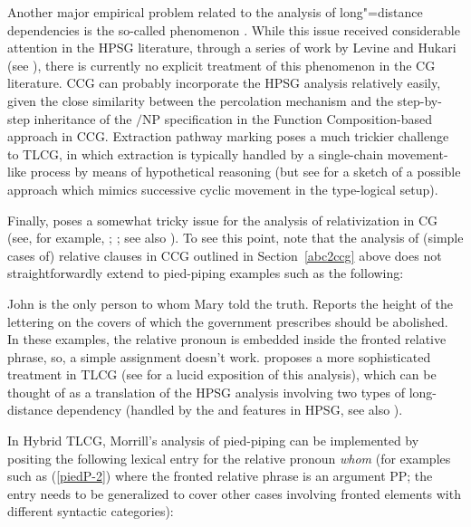 \documentclass[output=paper
                ,modfonts
 	        ,biblatex
                ,babelshorthands
                ,newtxmath
                ,draftmode
                ,colorlinks, citecolor=brown
]{langscibook}
\begin{document}
Another major empirical problem related to the analysis of
long"=distance dependencies is the so-called  phenomenon \citep{mccloskey79,Zaenen83a-u}. While this issue
received considerable attention in the HPSG literature, through a
series of work by Levine and Hukari (see \citealt{LH2006a}), there is
currently no explicit treatment of this phenomenon in the CG
literature. CCG can probably incorporate the HPSG analysis relatively
easily, given the close similarity between the \slasch percolation
mechanism and the step-by-step inheritance of the $/$NP specification
in the Function Composition-based approach in CCG. Extraction pathway
marking poses a much trickier challenge to TLCG, in which extraction
is typically handled by a single-chain movement-like process by means
of hypothetical reasoning (but see 
for a sketch of a possible approach which mimics successive cyclic
movement in the type-logical setup).

Finally,\label{cg:page-pied-piping-start}  poses a somewhat tricky issue for the
analysis of relativization in CG (see, for example,
\citealt{Pollard88a,Morrill94a-u};
\citealt[Section~8.6]{MuellerGT-Eng3}; see also
). To see this point,
note that the analysis of (simple cases of) relative clauses in CCG
outlined in Section~\ref{abc2ccg} above does not straightforwardly
extend to pied-piping examples such as the following:

\eal
\label{piedP}
\ex\label{piedP-2}
    John is the only person to whom Mary told the truth.
\ex\label{piedP-1}
    Reports the height of the lettering on the covers of which the
    government prescribes should be abolished. \mbox{}\hfill{\mbox{\citep[109]{Ross67a}}}
\zl
In these examples, the relative pronoun is embedded inside
the fronted relative phrase, so, a simple 
assignment doesn't work.
\citet[Chapter~4, Section~3.3]{Morrill94a-u} proposes 
a more sophisticated treatment in TLCG (see \citealt[Section~9.7]{Carpenter98a-u}
for a lucid exposition of this analysis), which can be thought of as
a translation of the HPSG analysis \citep[Chapter~5]{ps2} involving two types
of long-distance dependency (handled by the
\REL and \SLASH features
in HPSG, see also ).

In Hybrid TLCG, Morrill's analysis of pied-piping
can be implemented by positing the following lexical entry for the
relative pronoun \textit{whom} (for examples such as (\ref{piedP-2}) where 
the fronted relative
phrase is an argument PP; the entry needs to be generalized to cover
other cases involving fronted elements with different syntactic categories): 
\end{document}

